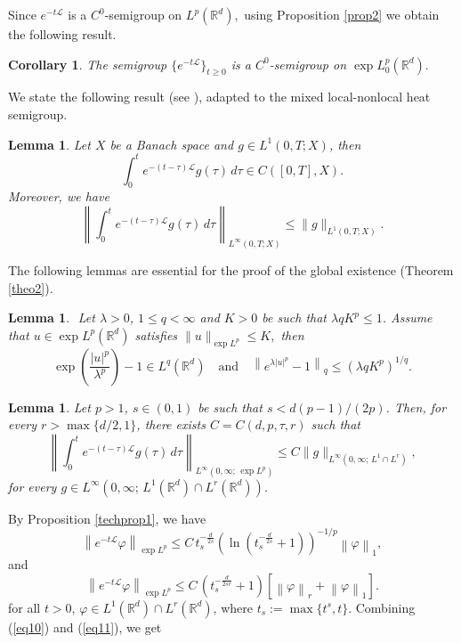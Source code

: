 \documentclass[a4paper,11pt]{amsart}
\renewcommand\eqref[1]{(\ref{#1})} %
\numberwithin{equation}{section}
\theoremstyle{plain}
\newtheorem{lemma}[theorem]{Lemma}
\newtheorem{corollary}{Corollary}
\theoremstyle{definition}
\begin{document}
Since $e^{-t\mathcal{L}}$ is a $C^0$-semigroup on $L^p(\mathbb{R}^d),$ using Proposition \ref{prop2} we obtain the following result.
\begin{corollary}The semigroup $\{e^{-t\mathcal{L}}\}_{t\geq0}$ is a $C^0$-semigroup on $\exp L^p_0(\mathbb{R}^d).$
    \end{corollary}

We state the following result (see \cite[Lemma 4.1.5]{CH}), adapted to the mixed local-nonlocal heat semigroup. 
\begin{lemma}\label{lemma10}
Let $X$ be a Banach space and $ g\in L^1(0,T;X)$, then $$\displaystyle \int_0^te^{-(t-\tau)\mathcal{L}}g(\tau)\,d\tau\in C([0,T],X).$$ Moreover, we have
$$\left\|\int_0^te^{-(t-\tau)\mathcal{L}}g(\tau)\,d\tau\right\|_{L^\infty(0,T;X)}\leq \|g\|_{L^1(0,T;X)}.$$
\end{lemma}
The following lemmas are essential for the proof of the global existence (Theorem \ref{theo2}).
\begin{lemma}${}$\label{lemma6}\cite[Lemma~2.6]{Majdoub2}
Let $\lambda>0$, $1\leq q<\infty$ and $K>0$ be such that $\lambda q K^p\leq 1$. Assume that $u\in\exp L^p(\mathbb{R}^d)$ satisfies
$\|u\|_{\exp L^p}\leq K,$
then $$\exp\left(\frac{|u|^p}{\lambda^p}\right)-1\in L^q(\mathbb{R}^d)\quad \text{and}\quad
\left\| e^{\lambda|u|^p}-1\right\|_{q}\leq \left(\lambda q K^p\right)^{1/q}.$$
\end{lemma}
\begin{lemma}${}$\label{lemma4}
Let $p>1$, $s 
\in (0, 1)$ be such that $s<d(p-1)/(2 p)$. Then, for every $r>\max\{d/2,1\}$, there exists $C=C(d,p,\tau,r)$ such that
 $$\left\|\int_0^te^{-(t-\tau)\mathcal{L}} g(\tau)\,d\tau\right\|_{L^\infty(0,\infty;\, \exp L^p)}\leq C\|g\|_{L^\infty(0,\infty;\,L^1\cap L^r)},$$ 
for every $g\in L^\infty(0,\infty;\, L^1(\mathbb{R}^d)\cap L^r(\mathbb{R}^d))$.
\end{lemma}
\proof By Proposition \ref{techprop1}, we have
\begin{equation}\label{eq10}
\left\|e^{-t\mathcal{L}} \varphi\right\|_{\exp L^p}\leq C\,t_s^{-\frac{d}{2 s}}\left(\ln( t_s^{-\frac{d}{2 s}}+1)\right)^{-1/p}\left\|\varphi\right\|_{1},
\end{equation}
and
\begin{equation}\label{eq11}
\left\|e^{-t\mathcal{L}} \varphi\right\|_{\exp L^p}\leq C\,(t_s^{-\frac{d}{2 s r}}+1)\left[\left\|\varphi\right\|_{r}+\left\|\varphi\right\|_{1}\right].
\end{equation}
for all $t>0$, $\varphi\in L^1(\mathbb{R}^d)\cap L^r(\mathbb{R}^d)$, where  $t_s:=\max\{t^s,t\}$. Combining \eqref{eq10} and \eqref{eq11}, we get
\end{document}
